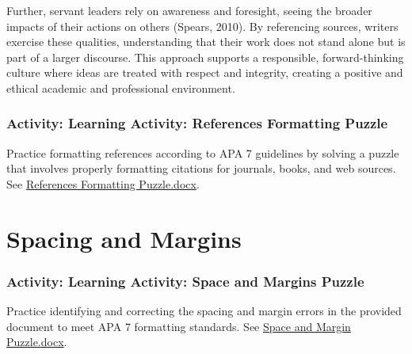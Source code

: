 \documentclass[
  letterpaper,
  DIV=11,
  numbers=noendperiod]{scrreprt}
\begin{document}
Further, servant leaders rely on awareness and foresight, seeing the
broader impacts of their actions on others (Spears, 2010). By
referencing sources, writers exercise these qualities, understanding
that their work does not stand alone but is part of a larger discourse.
This approach supports a responsible, forward-thinking culture where
ideas are treated with respect and integrity, creating a positive and
ethical academic and professional environment.

\subsection*{Activity: Learning Activity: References Formatting
Puzzle}\label{activity-learning-activity-references-formatting-puzzle}

Practice formatting references according to APA 7 guidelines by solving
a puzzle that involves properly formatting citations for journals,
books, and web sources. See
\href{https://learn.twu.ca/pluginfile.php/1424895/mod_book/chapter/42917/References\%20Formatting\%20Puzzle.docx}{References
Formatting Puzzle.docx}.

\subsection*{}\label{section-13}


\chapter*{Spacing and Margins}\label{spacing-and-margins}


\subsection*{Activity: Learning Activity: Space and Margins
Puzzle}\label{activity-learning-activity-space-and-margins-puzzle}

Practice identifying and correcting the spacing and margin errors in the
provided document to meet APA 7 formatting standards. See
\href{https://learn.twu.ca/pluginfile.php/1424895/mod_book/chapter/42918/Space\%20and\%20Margin\%20Puzzle.docx}{Space
and Margin Puzzle.docx}.
\end{document}
